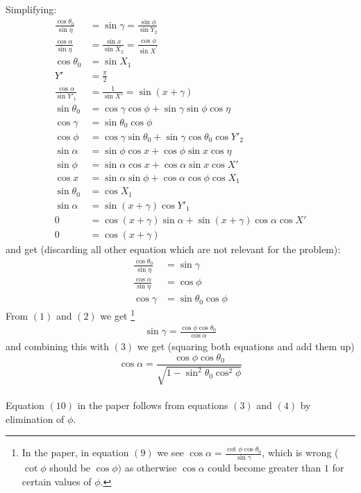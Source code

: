 Simplifying:
\begin{align*}
\frac{\cos{\theta_0}}{\sin{\eta}}&=\sin{\gamma}=\frac{\sin{\phi}}{\sin{Y_2}}\\
\frac{\cos{\alpha}}{\sin{\eta}}&=\frac{\sin{x}}{\sin{X_2}}=\frac{\cos{\phi}}{\sin{X^{'}}}\\
\cos{\theta_0}&=\sin{X_1}\\
Y'&=\frac{\pi}{2}\\
\frac{\cos{\alpha}}{\sin{Y'_1}}&=\frac{1}{\sin{X'}}=\sin{(x+\gamma)}\\
\sin{\theta_0}&=\cos{\gamma}\cos{\phi}+\sin{\gamma}\sin{\phi}\cos{\eta}\\
\cos{\gamma}&=\sin{\theta_0}\cos{\phi}\\
\cos{\phi}&=\cos{\gamma}\sin{\theta_0}+\sin{\gamma}\cos{\theta_0}\cos{Y'_2}\\
\sin{\alpha}&=\sin{\phi}\cos{x}+\cos{\phi}\sin{x}\cos{\eta}\\
\sin{\phi}&=\sin{\alpha}\cos{x}+\cos{\alpha}\sin{x}\cos{X'}\\
\cos{x}&=\sin{\alpha}\sin{\phi}+\cos{\alpha}\cos{\phi}\cos{X_1}\\
\sin{\theta_0}&=\cos{X_1}\\
\sin{\alpha}&=\sin{(x+\gamma)}\cos{Y'_1}\\
0&=\cos{(x+\gamma)}\sin{\alpha}+\sin{(x+\gamma)}\cos{\alpha}\cos{X'}\\
0&=\cos{(x+\gamma)}
\end{align*}
and get (discarding all other equation which are not relevant for the problem):
\begin{align}
\frac{\cos{\theta_0}}{\sin{\eta}}&=\sin{\gamma}\\
\frac{\cos{\alpha}}{\sin{\eta}}&=\cos{\phi}\\
\cos{\gamma}&=\sin{\theta_0}\cos{\phi}
\end{align}
From $(1)$ and $(2)$ we get \footnote{In the paper, in equation $(9)$ we see $\cos{\alpha}= \frac{\cot{\phi}\cos{\theta_0}}{\sin{\gamma}}$, which is wrong ($\cot{\phi}$ should be $\cos{\phi})$ as otherwise $\cos{\alpha}$ could become greater than $1$ for certain values of $\phi$.}
\begin{align}\sin{\gamma} =\frac{\cos{\phi}\cos{\theta_0}}{\cos{\alpha}}\end{align} and combining this with $(3)$ we get (squaring both equations and  add them up)
$$\cos{\alpha}= \frac{\cos{\phi}\cos{\theta_0}}{\sqrt{1-\sin^2{\theta_0}\cos^2{\phi}}}$$\\
Equation $(10)$ in the paper follows from equations $(3)$ and $(4)$ by elimination of $\phi$.

